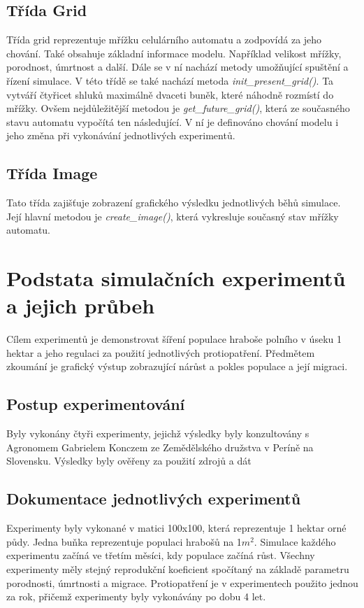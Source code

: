 \documentclass[a4paper,11pt]{article}
\begin{document}
\subsection{Třída Grid}
Třída grid reprezentuje mřížku celulárního automatu a zodpovídá za jeho chování. Také obsahuje základní informace modelu. Například velikost mřížky, porodnost, úmrtnost a další. Dále se v ní nachází metody umožňující spuštění a řízení simulace. V této třídě se také nachází metoda \emph{init\_present\_grid()}. Ta vytváří čtyřicet shluků maximálně dvaceti buněk, které náhodně rozmístí do mřížky.
Ovšem nejdůležitější metodou je \emph{get\_future\_grid()}, která ze současného stavu automatu vypočítá ten následující. V ní je definováno chování modelu i jeho změna při vykonávání jednotlivých experimentů.

\subsection{Třída Image}
Tato třída zajišťuje zobrazení grafického výsledku jednotlivých běhů simulace. Její hlavní metodou je \emph{create\_image()}, která vykresluje současný stav mřížky automatu.


\section{Podstata simulačních experimentů a jejich průbeh}
Cílem experimentů je demonstrovat šíření populace hraboše polního v úseku 1 hektar a jeho regulaci za použití jednotlivých protiopatření. Předmětem zkoumání je grafický výstup zobrazující nárůst a pokles populace a její migraci. 
\subsection{Postup experimentování}
Byly vykonány čtyři experimenty, jejichž výsledky byly konzultovány s Agronomem Gabrielem Konczem ze Zemědělského družstva v Períně na Slovensku. Výsledky byly ověřeny za použití zdrojů a dát\cite{Voles-popul-data:online}
\subsection{Dokumentace jednotlivých experimentů}
Experimenty byly vykonané v matici 100x100, která reprezentuje 1 hektar orné půdy. Jedna buňka reprezentuje populaci hrabošů na 1$m^{2}$. Simulace každého experimentu začíná ve třetím měsíci, kdy populace začíná růst. Všechny experimenty měly stejný reprodukční koeficient spočítaný na základě parametru porodnosti, úmrtnosti a migrace. Protiopatření je v experimentech použito jednou za rok, přičemž experimenty byly vykonávány po dobu 4 let.
\end{document}
